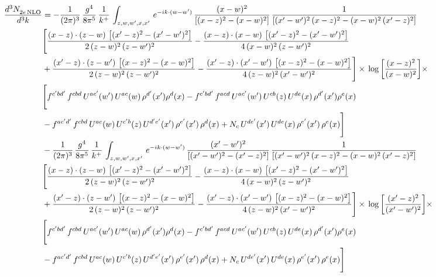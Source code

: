 \documentclass[9pt]{article}
\numberwithin{equation}{section}
\begin{document}
\begin{align}
 \frac{d^{3}N_{2e\,\rm NLO}^{\rm}}{d^{3}k}  & =   -\frac{1}{(2\pi)^{3}}\, \frac{g^{4}}{8\pi^{5}}\,\frac{1}{k^{+}}\,\int_{z,w,w^{\prime},x,x'}\, e^{-ik\cdot (w-w')}\,\frac{(x-w)^{2}}{\left[(x-z)^{2}-(x-w)^{2}\right]}\, \frac{1}{\left[(x'-w')^{2}\, (x-z)^{2} - (x-w)^{2}\, (x'-z)^{2}\right]} \notag \\ & \Bigg[\frac{(x-z)\cdot (z-w)\, \left[(x'-z)^{2}-(x'-w')^{2}\right]}{2\, (z-w)^{2}\, (z-w')^{2}}  - \frac{(x-z)\cdot (x-w)\,\left[(x'-z)^{2}-(x'-w')^{2}\right] }{4\,(x-w)^{2}\,(z-w')^{2}}\notag \\ & +\frac{(x'-z)\cdot (z-w')\, \left[(x-z)^{2}-(x-w)^{2}\right]}{2\, (z-w)^{2}\, (z-w')^{2}}-\frac{(x'-z)\cdot (x'-w')\, \left[(x-z)^{2}-(x-w)^{2}\right]}{4\, (z-w)^{2}\,(x'-w')^{2}}\Bigg]\times\,\log{\left[\frac{(x-z)^{2}}{(x-w)^{2}}\right]}\times\,\notag \\ & \Bigg[f^{c'bd'}\,f^{cbd}\, U^{ac'}(w')\,U^{ac}(w)\,\rho^{d'}(x')\rho^{d}(x)- f^{c'bd'}\,f^{acd}\,U^{ac'}(w')\,U^{cb}(z)\,U^{de}(x)\,\rho^{d'}(x')\rho^{e}(x) \notag \\ & -f^{ac'd'}\,f^{cbd}\,U^{ac}(w)\,U^{c'b}(z)\,U^{d'e'}(x')\,\rho^{e'}(x')\,\rho^{d}(x) +N_{c}\,U^{de'}(x')\,U^{de}(x)\,\rho^{e'}(x')\,\rho^{e}(x)\Bigg] \notag \\
& -\frac{1}{(2\pi)^{3}}\, \frac{g^{4}}{8\pi^{5}}\,\frac{1}{k^{+}}\,\int_{z,w,w^{\prime},x,x'}\, e^{-ik\cdot (w-w')}\, \frac{(x'-w')^{2}}{\left[(x'-w')^{2}-(x'-z)^{2}\right]}\, \frac{1}{\left[(x'-w')^{2}\, (x-z)^{2} - (x-w)^{2}\, (x'-z)^{2}\right]}  \notag \\ & \Bigg[\frac{(x-z)\cdot (z-w)\, \left[(x'-z)^{2}-(x'-w')^{2}\right]}{2\, (z-w)^{2}\, (z-w')^{2}}  - \frac{(x-z)\cdot (x-w)\,\left[(x'-z)^{2}-(x'-w')^{2}\right] }{4\,(x-w)^{2}\,(z-w')^{2}}\notag \\ & +\frac{(x'-z)\cdot (z-w')\, \left[(x-z)^{2}-(x-w)^{2}\right]}{2\, (z-w)^{2}\, (z-w')^{2}}-\frac{(x'-z)\cdot (x'-w')\, \left[(x-z)^{2}-(x-w)^{2}\right]}{4\, (z-w)^{2}\,(x'-w')^{2}}\Bigg]\times\,\log{\left[\frac{(x'-z)^{2}}{(x'-w')^{2}}\right]}\times\notag \\ & \Bigg[f^{c'bd'}\,f^{cbd}\, U^{ac'}(w')\,U^{ac}(w)\,\rho^{d'}(x')\rho^{d}(x)- f^{c'bd'}\,f^{acd}\,U^{ac'}(w')\,U^{cb}(z)\,U^{de}(x)\,\rho^{d'}(x')\rho^{e}(x) \notag \\ & -f^{ac'd'}\,f^{cbd}\,U^{ac}(w)\,U^{c'b}(z)\,U^{d'e'}(x')\,\rho^{e'}(x')\,\rho^{d}(x) +N_{c}\,U^{de'}(x')\,U^{de}(x)\,\rho^{e'}(x')\,\rho^{e}(x)\Bigg]
\end{align}
\end{document}
